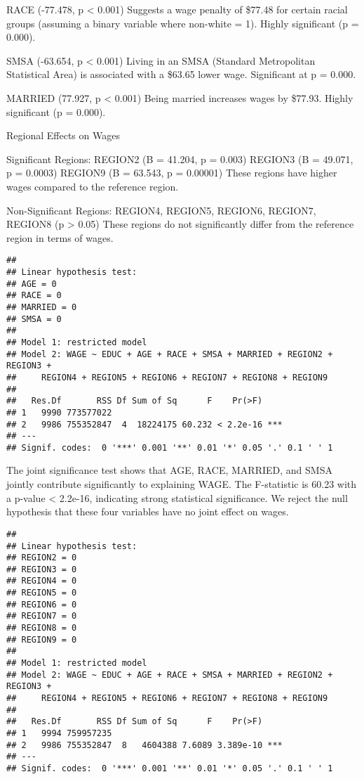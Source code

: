 \documentclass[
]{article}
\begin{document}
RACE (-77.478, p \textless{} 0.001) Suggests a wage penalty of \$77.48
for certain racial groups (assuming a binary variable where non-white =
1). Highly significant (p = 0.000).

SMSA (-63.654, p \textless{} 0.001) Living in an SMSA (Standard
Metropolitan Statistical Area) is associated with a \$63.65 lower wage.
Significant at p = 0.000.

MARRIED (77.927, p \textless{} 0.001) Being married increases wages by
\$77.93. Highly significant (p = 0.000).

Regional Effects on Wages

Significant Regions: REGION2 (B = 41.204, p = 0.003) REGION3 (B =
49.071, p = 0.0003) REGION9 (B = 63.543, p = 0.00001) These regions have
higher wages compared to the reference region.

Non-Significant Regions: REGION4, REGION5, REGION6, REGION7, REGION8 (p
\textgreater{} 0.05) These regions do not significantly differ from the
reference region in terms of wages.

\begin{verbatim}
## 
## Linear hypothesis test:
## AGE = 0
## RACE = 0
## MARRIED = 0
## SMSA = 0
## 
## Model 1: restricted model
## Model 2: WAGE ~ EDUC + AGE + RACE + SMSA + MARRIED + REGION2 + REGION3 + 
##     REGION4 + REGION5 + REGION6 + REGION7 + REGION8 + REGION9
## 
##   Res.Df       RSS Df Sum of Sq      F    Pr(>F)    
## 1   9990 773577022                                  
## 2   9986 755352847  4  18224175 60.232 < 2.2e-16 ***
## ---
## Signif. codes:  0 '***' 0.001 '**' 0.01 '*' 0.05 '.' 0.1 ' ' 1
\end{verbatim}

The joint significance test shows that AGE, RACE, MARRIED, and SMSA
jointly contribute significantly to explaining WAGE. The F-statistic is
60.23 with a p-value \textless{} 2.2e-16, indicating strong statistical
significance. We reject the null hypothesis that these four variables
have no joint effect on wages.

\begin{verbatim}
## 
## Linear hypothesis test:
## REGION2 = 0
## REGION3 = 0
## REGION4 = 0
## REGION5 = 0
## REGION6 = 0
## REGION7 = 0
## REGION8 = 0
## REGION9 = 0
## 
## Model 1: restricted model
## Model 2: WAGE ~ EDUC + AGE + RACE + SMSA + MARRIED + REGION2 + REGION3 + 
##     REGION4 + REGION5 + REGION6 + REGION7 + REGION8 + REGION9
## 
##   Res.Df       RSS Df Sum of Sq      F    Pr(>F)    
## 1   9994 759957235                                  
## 2   9986 755352847  8   4604388 7.6089 3.389e-10 ***
## ---
## Signif. codes:  0 '***' 0.001 '**' 0.01 '*' 0.05 '.' 0.1 ' ' 1
\end{verbatim}
\end{document}
